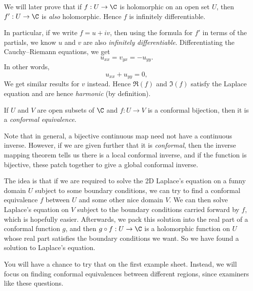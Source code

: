 \documentclass[a4paper]{article}
\begin{document}
We will later prove that if $f: U \to \C$ is holomorphic on an open set $U$, then $f': U \to \C$ is \emph{also} holomorphic. Hence $f$ is infinitely differentiable.

In particular, if we write $f = u + iv$, then using the formula for $f'$ in terms of the partials, we know $u$ and $v$ are also \emph{infinitely differentiable}. Differentiating the Cauchy--Riemann equations, we get
\[
  u_{xx} = v_{yx} = -u_{yy}.
\]
In other words,
\[
  u_{xx} + u_{yy} = 0,
\]
We get similar results for $v$ instead. Hence $\Re(f)$ and $\Im(f)$ satisfy the Laplace equation and are hence \emph{harmonic} (by definition).

\begin{defi}
  If $U$ and $V$ are open subsets of $\C$ and $f: U \to V$ is a conformal bijection, then it is a \emph{conformal equivalence}.
\end{defi}
Note that in general, a bijective continuous map need not have a continuous inverse. However, if we are given further that it is \emph{conformal}, then the inverse mapping theorem tells us there is a local conformal inverse, and if the function is bijective, these patch together to give a global conformal inverse.

The idea is that if we are required to solve the 2D Laplace's equation on a funny domain $U$ subject to some boundary conditions, we can try to find a conformal equivalence $f$ between $U$ and some other nice domain $V$. We can then solve Laplace's equation on $V$ subject to the boundary conditions carried forward by $f$, which is hopefully easier. Afterwards, we pack this solution into the real part of a conformal function $g$, and then $g \circ f: U \to \C$ is a holomorphic function on $U$ whose real part satisfies the boundary conditions we want. So we have found a solution to Laplace's equation.

You will have a chance to try that on the first example sheet. Instead, we will focus on finding conformal equivalences between different regions, since examiners like these questions.
\end{document}
